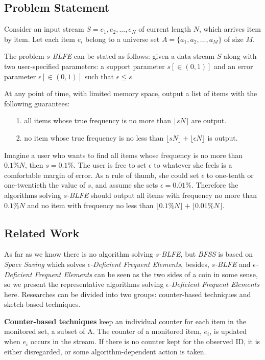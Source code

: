 \documentclass[conference]{IEEEtran}
\begin{document}
\subsection{Problem Statement}
Consider an input stream $S = e_1,e_2,..., e_N$ of current length $N$, which arrives item by item. Let each item $e_i$ belong to a universe set $A=\{a_1,a_2,...,a_M\}$ of size $M$.\par
The problem \emph{$s$-BLFE} can be stated as follows: given a data stream $S$ along with two user-specified parameters: a support parameter $s[\in (0,1)]$ and an error parameter $\epsilon[\in (0,1)]$ such that $\epsilon\leq s$.\par
At any point of time, with limited memory space, output a list of items with the following guarantees: 
\begin{enumerate}
\item[1.] all items whose true frequency is no more than $\lfloor sN\rfloor$ are output.
\item[2.] no item whose true frequency is no less than $\lfloor sN\rfloor+\lfloor\epsilon N\rfloor$ is output.
\end{enumerate}\par
Imagine a user who wants to find all items whose frequency is no more than $0.1\%N$, then $s=0.1\%$. The user is free to set $\epsilon$ to whatever she feels is a comfortable margin of error. As a rule of thumb, she could set $\epsilon$ to one-tenth or one-twentieth the value of $s$, and assume she sets $\epsilon=0.01\%$. Therefore the algorithms solving \emph{$s$-BLFE} should output all items with frequency no more than $0.1\%N$ and no item with frequency no less than $\lfloor 0.1\%N\rfloor+\lfloor 0.01\%N\rfloor$.

\subsection{Related Work}
As far as we know there is no algorithm solving \emph{$s$-BLFE}, but \emph{BFSS} is based on \emph{Space Saving} which solves \emph{$\epsilon$-Deficient Frequent Elements}, besides, \emph{$s$-BLFE} and \emph{$\epsilon$-Deficient Frequent Elements} can be seen as the two sides of a coin in some sense, so we present the representative algorithms solving \emph{$\epsilon$-Deficient Frequent Elements} here. Researches can be divided into two groups: counter-based techniques and sketch-based techniques.\par

\textbf{Counter-based techniques} keep an individual counter for each item in the monitored set, a subset of A. The counter of a monitored item, $e_i$, is updated when $e_i$ occurs in the stream. If there is no counter kept for the observed ID, it is either disregarded, or some algorithm-dependent action is taken.\par
\end{document}
